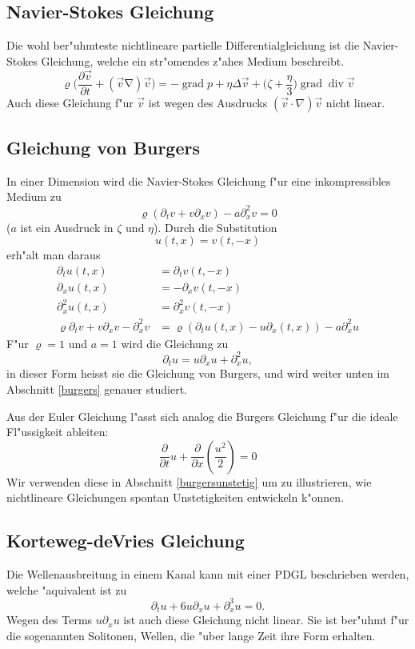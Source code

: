 \subsection{Navier-Stokes Gleichung}
Die wohl ber"uhmteste nichtlineare partielle Differentialgleichung ist
die Navier-Stokes Gleichung, welche ein str"omendes z"ahes Medium beschreibt.
\[
\varrho\biggl(
\frac{\partial \vec v}{\partial t}+(\vec v\operatorname \nabla)\vec v
\biggr)
=
-\operatorname{grad}p
+\eta\Delta \vec v+\biggl(\zeta+\frac{\eta}3\biggr)\operatorname{grad}\operatorname{div}\vec v
\]
Auch diese Gleichung f"ur $\vec v$ ist wegen des Ausdrucks $(\vec v\cdot\nabla)\vec v$
nicht linear.

\subsection{Gleichung von Burgers}
In einer Dimension  wird die Navier-Stokes Gleichung f"ur eine inkompressibles
Medium zu
\[
\varrho(\partial_t v+v\partial_x v)-a\partial_x^2v=0
\]
($a$ ist ein Ausdruck in $\zeta$ und $\eta$).
Durch die Substitution
\[
u(t,x)=v(t,-x)
\]
erh"alt man daraus 
\begin{align*}
\partial_tu(t,x)&=\partial_tv(t,-x)\\
\partial_xu(t,x)&=-\partial_xv(t,-x)\\
\partial_x^2u(t,x)&=\partial_x^2v(t,-x)\\
\varrho
\partial_t v+v\partial_x v-\partial_x^2v
&=
\varrho(\partial_tu(t,x)-u\partial_x(t,x))-a\partial_x^2u
\end{align*}
F"ur $\varrho=1$ und $a=1$ wird die Gleichung zu
\[
\partial_tu=u\partial_xu+\partial_x^2u,
\]
in dieser Form heisst sie die Gleichung von Burgers,
und wird weiter unten im Abschnitt
\ref{burgers} genauer studiert.

Aus der Euler Gleichung l"asst sich analog die Burgers Gleichung
f"ur die ideale Fl"ussigkeit ableiten:
\[
\frac{\partial}{\partial t}u+\frac{\partial}{\partial x}\left(\frac{u^2}2\right)
=0
\]
Wir verwenden diese in Abschnitt \ref{burgersunstetig} um zu illustrieren,
wie nichtlineare Gleichungen spontan Unstetigkeiten entwickeln k"onnen.

\subsection{Korteweg-deVries Gleichung}
Die Wellenausbreitung in einem Kanal kann mit einer PDGL beschrieben werden,
welche "aquivalent ist zu
\[
\partial_tu+6u\partial_xu+\partial_x^3u=0.
\]
Wegen des Terms $u\partial_xu$ ist auch diese Gleichung nicht linear.
Sie ist ber"uhmt f"ur die sogenannten Solitonen, Wellen, die "uber
lange Zeit ihre Form erhalten.

